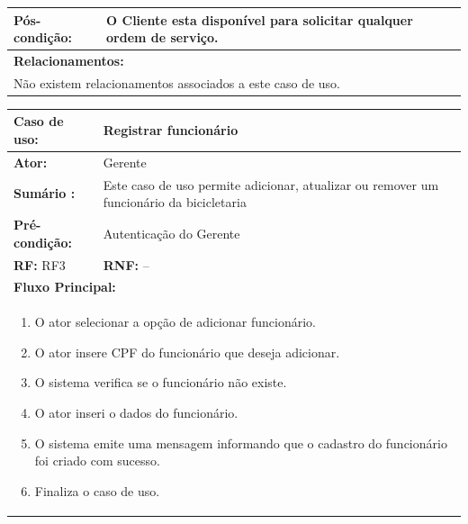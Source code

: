 \documentclass[
	12pt,				%
	openright,
	oneside,			%
	a4paper,			%
	chapter=TITLE,		%
	brazil				%
	]{abntex2}
\begin{document}
\begin{table}[h]
\begin{tabular}{|p{3cm}|p{3cm}|p{3cm}|p{3cm}|}
\textbf{Pós-condição: }  & \multicolumn{3}{p{9cm}|}{O Cliente esta disponível para solicitar qualquer ordem de serviço.}		\\ \hline
\multicolumn{4}{|p{12cm}|}{\textbf{Relacionamentos:}}                                        								\\ \hline
\multicolumn{4}{|p{12cm}|}{Não existem relacionamentos associados a este caso de uso.}                                  \\ \hline
\end{tabular}
\end{table}




\begin{table}[h]
\centering
\begin{tabular}{|p{3cm}|p{3cm}|p{3cm}|p{3cm}|}
\hline
\textbf{Caso de uso:}             & \multicolumn{3}{p{9cm}|}{Registrar funcionário}				 \\ \hline
\textbf{Ator:}                 & \multicolumn{3}{p{9cm}|}{Gerente}         			          						 	\\ \hline
\textbf{Sumário :}                & \multicolumn{3}{p{9cm}|}{Este caso de uso permite adicionar, atualizar ou remover um funcionário %
													 da bicicletaria} 											        	\\ \hline
\textbf{Pré-condição:}            & \multicolumn{3}{p{9cm}|}{ Autenticação do Gerente }                				    \\ \hline
\multicolumn{2}{|p{6cm}|}{\textbf{RF:} RF3 }                  & \multicolumn{2}{p{6cm}|}{\textbf{RNF:} --}     	    \\ \hline
\multicolumn{4}{|p{12cm}|}{\textbf{Fluxo Principal:}}                                                					\\ \hline
\multicolumn{4}{|p{12cm}|}{%
\begin{enumerate}
  \item O ator selecionar a opção de adicionar funcionário.
  \item O ator insere CPF do funcionário que deseja adicionar.
  \item O sistema verifica se o funcionário não existe.
  \item O ator inseri o dados do funcionário.
  \item O sistema emite uma mensagem informando que o cadastro do funcionário foi criado com sucesso.
  \item Finaliza o caso de uso.
\end{enumerate}}                                                               				 							\\ \hline


\end{tabular}
\end{table}
\end{document}
